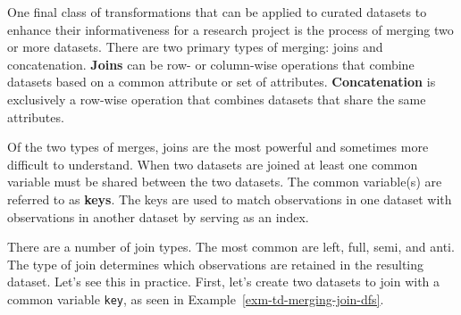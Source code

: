 \documentclass[
  letterpaper,
  DIV=11,
  numbers=noendperiod]{scrreport}
\theoremstyle{definition}
\theoremstyle{remark}
\begin{document}
One final class of transformations that can be applied to curated
datasets to enhance their informativeness for a research project is the
process of merging two or more datasets. There are two primary types of
merging: joins and concatenation. \textbf{Joins} can be row- or
column-wise operations that combine datasets based on a common attribute
or set of attributes. \textbf{Concatenation} is exclusively a row-wise
operation that combines datasets that share the same attributes.

Of the two types of merges, joins are the most powerful and sometimes
more difficult to understand. When two datasets are joined at least one
common variable must be shared between the two datasets. The common
variable(s) are referred to as \textbf{keys}. The keys are used to match
observations in one dataset with observations in another dataset by
serving as an index.

There are a number of join types. The most common are left, full, semi,
and anti. The type of join determines which observations are retained in
the resulting dataset. Let's see this in practice. First, let's create
two datasets to join with a common variable \texttt{key}, as seen in
Example~\ref{exm-td-merging-join-dfs}.
\end{document}
